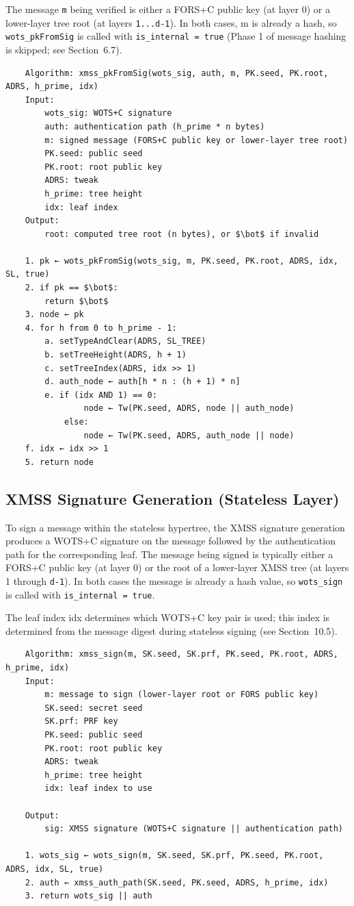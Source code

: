 The message \texttt{m} being verified is either a FORS+C public key (at layer 0) or a lower-layer tree root (at layers \texttt{1...d-1}). In both cases, m is already a hash, so \texttt{wots\_pkFromSig} is called with \texttt{is\_internal = true} (Phase 1 of message hashing is skipped; see Section~6.7).

\begin{verbatim}
    Algorithm: xmss_pkFromSig(wots_sig, auth, m, PK.seed, PK.root, ADRS, h_prime, idx)
    Input:
        wots_sig: WOTS+C signature
        auth: authentication path (h_prime * n bytes)
        m: signed message (FORS+C public key or lower-layer tree root)
        PK.seed: public seed
        PK.root: root public key
        ADRS: tweak
        h_prime: tree height
        idx: leaf index
    Output:
        root: computed tree root (n bytes), or $\bot$ if invalid

    1. pk ← wots_pkFromSig(wots_sig, m, PK.seed, PK.root, ADRS, idx, SL, true)
    2. if pk == $\bot$:
        return $\bot$
    3. node ← pk
    4. for h from 0 to h_prime - 1:
        a. setTypeAndClear(ADRS, SL_TREE)
        b. setTreeHeight(ADRS, h + 1)
        c. setTreeIndex(ADRS, idx >> 1)
        d. auth_node ← auth[h * n : (h + 1) * n]
        e. if (idx AND 1) == 0:
                node ← Tw(PK.seed, ADRS, node || auth_node)
            else:
                node ← Tw(PK.seed, ADRS, auth_node || node)
    f. idx ← idx >> 1
    5. return node
\end{verbatim}

\subsection{XMSS Signature Generation (Stateless Layer)}
To sign a message within the stateless hypertree, the XMSS signature generation produces a WOTS+C signature on the message followed by the authentication path for the corresponding leaf. The message being signed is typically either a FORS+C public key (at layer 0) or the root of a lower-layer XMSS tree (at layers 1 through \texttt{d-1}). In both cases the message is already a hash value, so \texttt{wots\_sign} is called with \texttt{is\_internal = true}.

The leaf index idx determines which WOTS+C key pair is used; this index is determined from the message digest during stateless signing (see Section~10.5).

\begin{verbatim}
    Algorithm: xmss_sign(m, SK.seed, SK.prf, PK.seed, PK.root, ADRS, h_prime, idx)
    Input:
        m: message to sign (lower-layer root or FORS public key)
        SK.seed: secret seed
        SK.prf: PRF key
        PK.seed: public seed
        PK.root: root public key
        ADRS: tweak
        h_prime: tree height
        idx: leaf index to use

    Output:
        sig: XMSS signature (WOTS+C signature || authentication path)

    1. wots_sig ← wots_sign(m, SK.seed, SK.prf, PK.seed, PK.root, ADRS, idx, SL, true)
    2. auth ← xmss_auth_path(SK.seed, PK.seed, ADRS, h_prime, idx)
    3. return wots_sig || auth
\end{verbatim}

